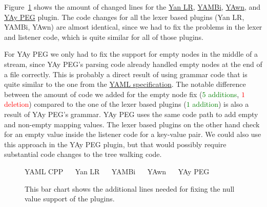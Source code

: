 Figure~\ref{fig:null_line_count} shows the amount of changed lines for the \href{https://issues.libelektra.org/2662}{Yan LR}, \href{https://issues.libelektra.org/2663}{YAMBi}, \href{https://issues.libelektra.org/2664}{YAwn}, and \href{https://issues.libelektra.org/2665}{YAy PEG} plugin. The code changes for all the lexer based plugins (Yan LR, YAMBi, YAwn) are almost identical, since we had to fix the problems in the lexer and listener code, which is quite similar for all of those plugins.

For YAy PEG we only had to fix the support for empty nodes in the middle of a  stream, since YAy PEG’s parsing code already handled empty nodes at the end of a file correctly. This is probably a direct result of using grammar code that is quite similar to the one from the \href{http://yaml.org/spec/1.2/spec}{YAML specification}. The notable difference between the amount of code we added for the empty node fix (\textcolor{Green}{$5$ additions}, \textcolor{Red}{$1$ deletion}) compared to the one of the lexer based plugins (\textcolor{Green}{$1$ addition}) is also a result of YAy PEG’s grammar. YAy PEG uses the same code path to add empty and non-empty mapping values. The lexer based plugins on the other hand check for an empty value inside the listener code for a key-value pair. We could also use this approach in the YAy PEG plugin, but that would possibly require substantial code changes to the tree walking code.

\begin{figure}[H]
  \begin{bchart}[max=10, width=0.8\textwidth, unit={~Lines of Code}]
  \end{bchart}
  \begin{center}
  \vspace{-0.5cm}
     YAML CPP ~~
     Yan LR ~~
     YAMBi ~~
     YAwn ~~
     YAy PEG
  \vspace{-0.5cm}
  \end{center}
  \caption{This bar chart shows the additional lines needed for fixing the null value support of the  plugins.}
  \label{fig:null_line_count}
\end{figure}

